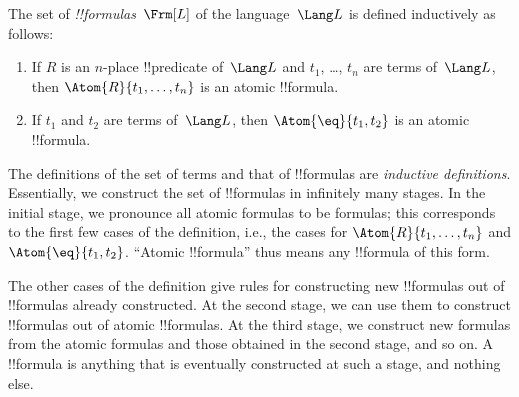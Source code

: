 \documentclass[../../include/open-logic-section]{subfiles}
\begin{document}
\begin{defn}[Formula]
The set of \emph{!!{formula}s}~$\Frm[L]$ of the language~$\Lang L$
is defined inductively as follows:
\begin{enumerate}


\item If $R$ is an $n$-place !!{predicate} of~$\Lang L$ and $t_1$, \dots,
  $t_n$ are terms of~$\Lang L$, then $\Atom{R}{t_1,\ldots, t_n}$ is an
  atomic !!{formula}.

\item If $t_1$ and $t_2$ are terms of~$\Lang L$, then $\Atom{\eq}{t_1, t_2}$
  is an atomic !!{formula}.  








\end{enumerate}
\end{defn}

\begin{explain}
The definitions of the set of terms and that of !!{formula}s are
\emph{inductive definitions}.  Essentially, we construct the set of
!!{formula}s in infinitely many stages.  In the initial stage, we
pronounce all atomic formulas to be formulas; this corresponds to the
first few cases of the definition, i.e., the cases for
% 
%
$\Atom{R}{t_1,\dots,t_n}$ and $\Atom{\eq}{t_1,t_2}$.  ``Atomic !!{formula}''
thus means any !!{formula} of this form.

The other cases of the definition give rules for constructing new
!!{formula}s out of !!{formula}s already constructed.  At the second
stage, we can use them to construct !!{formula}s out of atomic
!!{formula}s.  At the third stage, we construct new formulas from the
atomic formulas and those obtained in the second stage, and so on.  A
!!{formula} is anything that is eventually constructed at such a
stage, and nothing else.
\end{explain}
\end{document}
